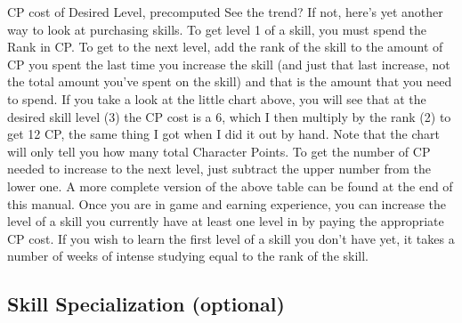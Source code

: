 \documentclass[twoside]{book}
\begin{document}
              
            CP cost of Desired Level, precomputed  
           See the trend?  If not, here's yet another way to look at
             purchasing skills.  To get level 1 of a skill, you must spend the Rank in
             CP. To get to the next level, add the rank of the skill to
             the amount of CP you spent the last time you increase the
             skill (and just that last increase, not the total amount
             you've spent on the skill) and that is the amount that
             you need to spend. 
   If you take a look at the little chart above, you will
             see that at the desired skill level (3) the CP cost is a 6,
             which I then multiply by the rank (2) to get 12 CP, the same
             thing I got when I did it out by hand.  Note that the chart will only tell you how many total
             Character Points. To get the number of CP needed to increase
             to the next level, just subtract the upper number from the
             lower one. A more complete version of the above table can be
             found at the end of this manual.  Once you are in game and earning experience, you can
             increase the level of a skill you currently have at least
             one level in by paying the appropriate CP cost. If you wish
             to learn the first level of a skill you don't have
             yet, it takes a number of weeks of intense studying equal to
             the rank of the skill. 
\subsection{Skill Specialization (optional)}
    
\end{document}
